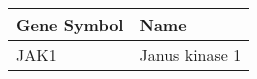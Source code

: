 \begin{tabular}{ll}
\toprule
Gene Symbol &           Name \\
\midrule
       JAK1 & Janus kinase 1 \\
\bottomrule
\end{tabular}
